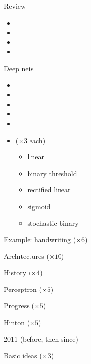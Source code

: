 




Review
\begin{itemize}
\item {}
\item {}
\item {}
\item {}
\end{itemize}

Deep nets
\begin{itemize}
\item {}
\item {}
\item {}
\item {}
\item {}
\item {} ($\times 3$ each)
  \begin{itemize}
  \item linear
  \item binary threshold
  \item rectified linear
  \item sigmoid
  \item stochastic binary
  \end{itemize}
\end{itemize}

Example: handwriting ($\times 6$)

Architectures ($\times 10$)

History ($\times 4$)

Perceptron ($\times 5$)

Progress ($\times 5$)

Hinton ($\times 5$)

2011 (before, then since)

Basic ideas ($\times 3$)


